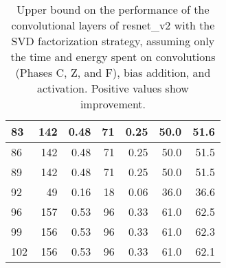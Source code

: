 \begin{table}
\begin{tabular}{|l|r|r|r|r|r|r|}
83 & 142 & 0.48 & 71 & 0.25 & 50.0 & 51.6 \\\hline
86 & 142 & 0.48 & 71 & 0.25 & 50.0 & 51.5 \\\hline
89 & 142 & 0.48 & 71 & 0.25 & 50.0 & 51.5 \\\hline
92 & 49 & 0.16 & 18 & 0.06 & 36.0 & 36.6 \\\hline
96 & 157 & 0.53 & 96 & 0.33 & 61.0 & 62.5 \\\hline
99 & 156 & 0.53 & 96 & 0.33 & 61.0 & 62.3 \\\hline
102 & 156 & 0.53 & 96 & 0.33 & 61.0 & 62.1 \\\hline
\end{tabular}
\caption{Upper bound on the performance of the convolutional layers of resnet\_v2 with the SVD factorization strategy, assuming only the time and energy spent on convolutions (Phases C, Z, and F), bias addition, and activation. Positive values show improvement.}
\label{resnet_v2-max-performance}
\end{table}
